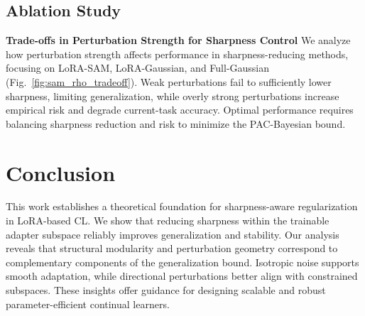 \documentclass[letterpaper]{article} %
\begin{document}
\subsection{Ablation Study}




\textbf{Trade-offs in Perturbation Strength for Sharpness Control} We analyze how perturbation strength affects performance in sharpness-reducing methods, focusing on LoRA-SAM, LoRA-Gaussian, and Full-Gaussian (Fig.~\ref{fig:sam_rho_tradeoff}). Weak perturbations fail to sufficiently lower sharpness, limiting generalization, while overly strong perturbations increase empirical risk and degrade current-task accuracy. Optimal performance requires balancing sharpness reduction and risk to minimize the PAC-Bayesian bound.

\section{Conclusion}



This work establishes a theoretical foundation for sharpness-aware regularization in LoRA-based CL. We show that reducing sharpness within the trainable adapter subspace reliably improves generalization and stability. Our analysis reveals that structural modularity and perturbation geometry correspond to complementary components of the generalization bound. Isotropic noise supports smooth adaptation, while directional perturbations better align with constrained subspaces. These insights offer guidance for designing scalable and robust parameter-efficient continual learners.

\end{document}
